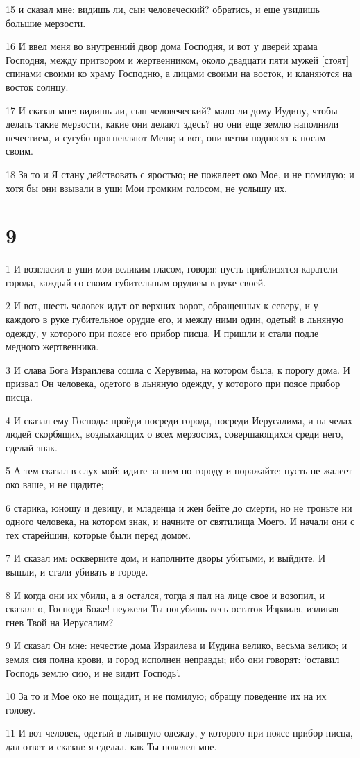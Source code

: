 \par 15 и сказал мне: видишь ли, сын человеческий? обратись, и еще увидишь большие мерзости.
\par 16 И ввел меня во внутренний двор дома Господня, и вот у дверей храма Господня, между притвором и жертвенником, около двадцати пяти мужей [стоят] спинами своими ко храму Господню, а лицами своими на восток, и кланяются на восток солнцу.
\par 17 И сказал мне: видишь ли, сын человеческий? мало ли дому Иудину, чтобы делать такие мерзости, какие они делают здесь? но они еще землю наполнили нечестием, и сугубо прогневляют Меня; и вот, они ветви подносят к носам своим.
\par 18 За то и Я стану действовать с яростью; не пожалеет око Мое, и не помилую; и хотя бы они взывали в уши Мои громким голосом, не услышу их.

\chapter{9}

\par 1 И возгласил в уши мои великим гласом, говоря: пусть приблизятся каратели города, каждый со своим губительным орудием в руке своей.
\par 2 И вот, шесть человек идут от верхних ворот, обращенных к северу, и у каждого в руке губительное орудие его, и между ними один, одетый в льняную одежду, у которого при поясе его прибор писца. И пришли и стали подле медного жертвенника.
\par 3 И слава Бога Израилева сошла с Херувима, на котором была, к порогу дома. И призвал Он человека, одетого в льняную одежду, у которого при поясе прибор писца.
\par 4 И сказал ему Господь: пройди посреди города, посреди Иерусалима, и на челах людей скорбящих, воздыхающих о всех мерзостях, совершающихся среди него, сделай знак.
\par 5 А тем сказал в слух мой: идите за ним по городу и поражайте; пусть не жалеет око ваше, и не щадите;
\par 6 старика, юношу и девицу, и младенца и жен бейте до смерти, но не троньте ни одного человека, на котором знак, и начните от святилища Моего. И начали они с тех старейшин, которые были перед домом.
\par 7 И сказал им: оскверните дом, и наполните дворы убитыми, и выйдите. И вышли, и стали убивать в городе.
\par 8 И когда они их убили, а я остался, тогда я пал на лице свое и возопил, и сказал: о, Господи Боже! неужели Ты погубишь весь остаток Израиля, изливая гнев Твой на Иерусалим?
\par 9 И сказал Он мне: нечестие дома Израилева и Иудина велико, весьма велико; и земля сия полна крови, и город исполнен неправды; ибо они говорят: `оставил Господь землю сию, и не видит Господь'.
\par 10 За то и Мое око не пощадит, и не помилую; обращу поведение их на их голову.
\par 11 И вот человек, одетый в льняную одежду, у которого при поясе прибор писца, дал ответ и сказал: я сделал, как Ты повелел мне.

